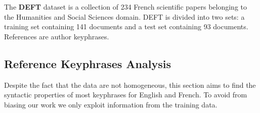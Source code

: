     The \textbf{DEFT} dataset \cite{Paroubek2012deft} is a collection of 234
    French scientific papers belonging to the Humanities and Social Sciences
    domain. DEFT is divided into two sets: a training set containing 141
    documents and a test set containing 93 documents. References are author
    keyphrases.

  \subsection{Reference Keyphrases Analysis}
  \label{subsec:keyphrase_analysis}
    Despite the fact that the data are not homogeneous, this section aims to
    find the syntactic properties of most keyphrases for English and French. To
    avoid from biasing our work we only exploit information from the training
    data.

